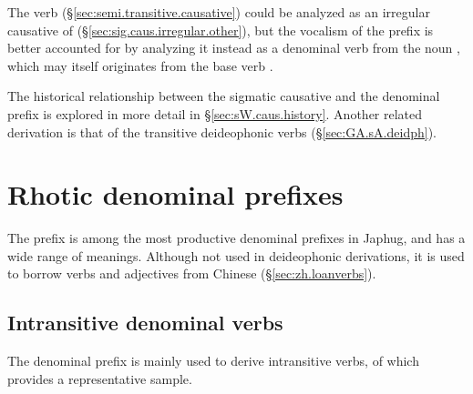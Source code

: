 The verb  (§\ref{sec:semi.transitive.causative}) could be analyzed as an irregular causative of  (§\ref{sec:sig.caus.irregular.other}), but the vocalism of the prefix is better accounted for by analyzing it instead as a denominal verb from the noun , which may itself originates from the base verb . 

The historical relationship between the sigmatic causative and the denominal  prefix is explored in more detail in §\ref{sec:sW.caus.history}. Another related derivation is that of the  transitive deideophonic verbs (§\ref{sec:GA.sA.deidph}).


\section{Rhotic denominal prefixes}\label{sec:denom.rA}
The  prefix is among the most productive denominal prefixes in Japhug, and has a wide range of meanings. Although not used in deideophonic derivations, it is used to borrow verbs and adjectives from Chinese (§\ref{sec:zh.loanverbs}).

\subsection{Intransitive denominal verbs}  \label{sec:denom.intr.rA}
The  denominal prefix is mainly used to derive intransitive verbs, of which  provides a representative sample. 
 
